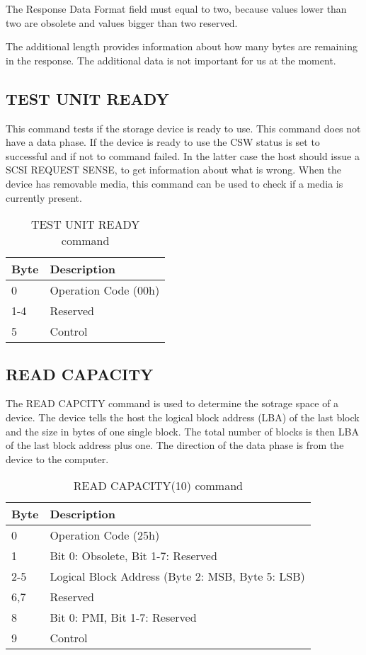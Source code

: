 The Response Data Format field must equal to two, because values lower than two are obsolete and values bigger than two reserved\cite{scsi_seagate}.

The additional length provides information about how many bytes are remaining in the response. The additional data is not important for us at the moment.

\subsection{TEST UNIT READY}

This command tests if the storage device is ready to use. This command does not have a data phase. If the device is ready to use the CSW status is set to successful and if not to command failed. In the latter case the host should issue a SCSI REQUEST SENSE, to get information about what is wrong. When the device has removable media, this command can be used to check if a media is currently present\cite{usb_ms_jan}.

\begin{table}[ht]
\caption{TEST UNIT READY command\cite{scsi_seagate}}
\centering
\begin{tabular}{|l|l|}
\hline\hline
\textbf{Byte} & \textbf{Description}\\ \hline
0 & Operation Code (00h)\\ \hline
1-4 & Reserved \\ \hline
5 & Control \\ \hline
\end{tabular}
\label{table:unit_ready}
\end{table}

\subsection{READ CAPACITY}

The READ CAPCITY command is used to determine the sotrage space of a device. The device tells the host the logical block address (LBA) of the last block and the size in bytes of one single block. The total number of blocks is then LBA of the last block address plus one. The direction of the data phase is from the device to the computer.

\begin{table}[ht]
\caption{READ CAPACITY(10) command\cite{scsi_seagate}}
\centering
\begin{tabular}{|l|l|}
\hline\hline
\textbf{Byte} & \textbf{Description}\\ \hline
0 & Operation Code (25h)\\ \hline
1 & Bit 0: Obsolete, Bit 1-7: Reserved \\ \hline
2-5 & Logical Block Address (Byte 2: MSB, Byte 5: LSB) \\ \hline
6,7 & Reserved \\ \hline
8 & Bit 0: PMI, Bit 1-7: Reserved \\ \hline
9 & Control \\ \hline
\end{tabular}
\label{table:read_capacity}
\end{table}

